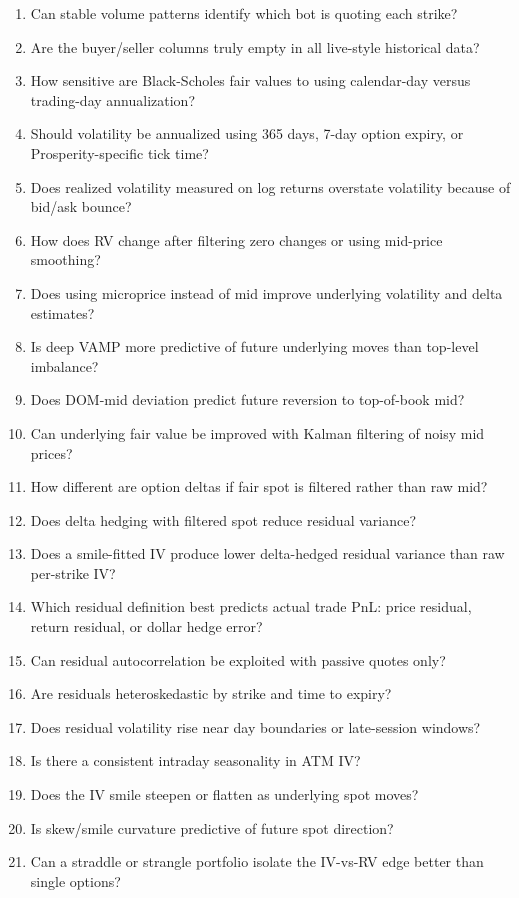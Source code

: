 \documentclass[11pt]{article}
\begin{document}
\begin{enumerate}[label=Q\arabic*.,leftmargin=*]
  \item Can stable volume patterns identify which bot is quoting each strike?
  \item Are the buyer/seller columns truly empty in all live-style historical data?
  \item How sensitive are Black-Scholes fair values to using calendar-day versus trading-day annualization?
  \item Should volatility be annualized using 365 days, 7-day option expiry, or Prosperity-specific tick time?
  \item Does realized volatility measured on log returns overstate volatility because of bid/ask bounce?
  \item How does RV change after filtering zero changes or using mid-price smoothing?
  \item Does using microprice instead of mid improve underlying volatility and delta estimates?
  \item Is deep VAMP more predictive of future underlying moves than top-level imbalance?
  \item Does DOM-mid deviation predict future reversion to top-of-book mid?
  \item Can underlying fair value be improved with Kalman filtering of noisy mid prices?
  \item How different are option deltas if fair spot is filtered rather than raw mid?
  \item Does delta hedging with filtered spot reduce residual variance?
  \item Does a smile-fitted IV produce lower delta-hedged residual variance than raw per-strike IV?
  \item Which residual definition best predicts actual trade PnL: price residual, return residual, or dollar hedge error?
  \item Can residual autocorrelation be exploited with passive quotes only?
  \item Are residuals heteroskedastic by strike and time to expiry?
  \item Does residual volatility rise near day boundaries or late-session windows?
  \item Is there a consistent intraday seasonality in ATM IV?
  \item Does the IV smile steepen or flatten as underlying spot moves?
  \item Is skew/smile curvature predictive of future spot direction?
  \item Can a straddle or strangle portfolio isolate the IV-vs-RV edge better than single options?

\end{enumerate}
\end{document}
